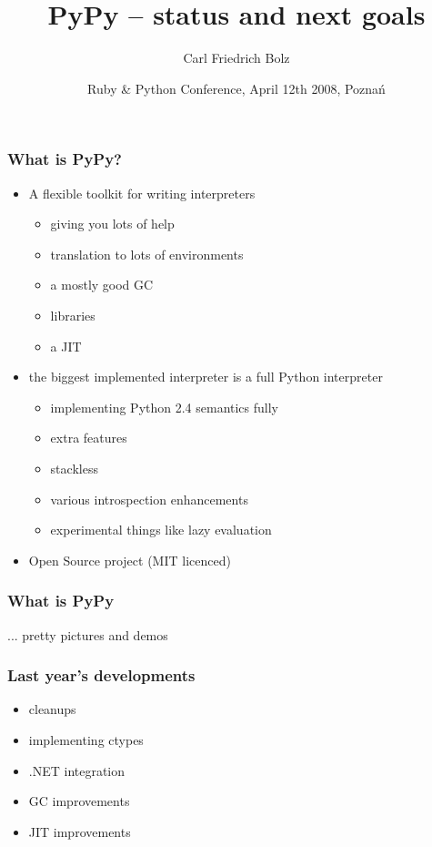 \documentclass[utf8x]{beamer}
\title{PyPy – status and next goals}
\author{Carl Friedrich Bolz}
\institute[Heinrich-Heine-Universität Düsseldorf]
{
  Institut für Informatik\\
  Heinrich-Heine-Universität Düsseldorf
}
\date{Ruby \& Python Conference, April 12th 2008, Poznań}
\begin{document}
\begin{frame}
  \titlepage
\end{frame}


\begin{frame}
  \frametitle{What is PyPy?}
  \begin{itemize}
  \item
    A flexible toolkit for writing interpreters
    \begin{itemize}
      \item
        giving you lots of help
      \item
        translation to lots of environments
      \item
        a mostly good GC
      \item
        libraries
      \item
        a JIT
    \end{itemize}
  \pause
  \item
    the biggest implemented interpreter is a full Python interpreter
    \begin{itemize}
      \item
        implementing Python 2.4 semantics fully
      \item
        extra features
      \item
        stackless
      \item
        various introspection enhancements
      \item
        experimental things like lazy evaluation
    \end{itemize}
  \item
    Open Source project (MIT licenced)
  \end{itemize}
\end{frame}


\begin{frame}
  \frametitle{What is PyPy}
  ... pretty pictures and demos
\end{frame}




\begin{frame}
  \frametitle{Last year's developments}
  \begin{itemize}
  \item
    cleanups
  \item
    implementing ctypes
  \item
    .NET integration
  \item
    GC improvements
  \item
    JIT improvements
  \end{itemize}
\end{frame}
\end{document}
